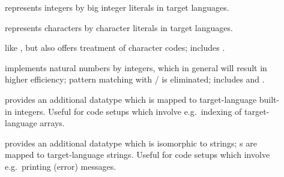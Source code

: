 \begin{isabellebody}
\begin{isamarkuptext}
  \begin{description}

    \item[\hyperlink{theory.Code-Integer}{\mbox{}}] represents  integers by
       big integer literals in target languages.

    \item[\hyperlink{theory.Code-Char}{\mbox{}}] represents  characters by
       character literals in target languages.

    \item[\hyperlink{theory.Code-Char-chr}{\mbox{}}] like , but
       also offers treatment of character codes; includes \hyperlink{theory.Code-Char}{\mbox{}}.

    \item[\hyperlink{theory.Efficient-Nat}{\mbox{}}] \label{eff_nat} implements
       natural numbers by integers, which in general will result in
       higher efficiency; pattern matching with  /
        is eliminated; includes \hyperlink{theory.Code-Integer}{\mbox{}}
       and \hyperlink{theory.Code-Numeral}{\mbox{}}.

    \item[\hyperlink{theory.Code-Numeral}{\mbox{}}] provides an additional datatype
        which is mapped to target-language built-in
       integers.  Useful for code setups which involve e.g.~indexing
       of target-language arrays.

    \item[\hyperlink{theory.String}{\mbox{}}] provides an additional datatype  which is isomorphic to strings; s are mapped to target-language strings.  Useful
       for code setups which involve e.g.~printing (error) messages.

  \end{description}


\end{isamarkuptext}
\end{isabellebody}
